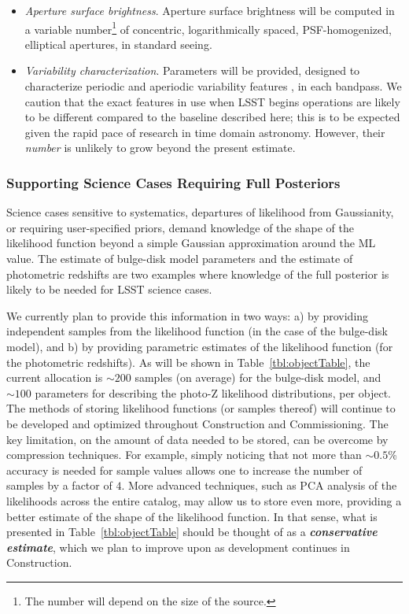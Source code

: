 \documentclass[12pt]{article}
\newcommand{\req}[1]{\marginpar{\tiny #1}}
\newcommand{\dmreq}[1]{\req{DMS-REQ-#1}}
\begin{document}
\begin{itemize}
    \item {\em Aperture surface brightness}. Aperture surface brightness will be computed in a variable number\footnote{The number will depend on the size of the source.} of concentric, logarithmically spaced, PSF-homogenized, elliptical apertures, in standard seeing. \dmreq{0276}

    \item {\em Variability characterization}. Parameters will be provided, designed to characterize periodic and aperiodic variability features \citep{2011ApJ...733...10R}, in each bandpass.
    We caution that the exact features in use when LSST begins operations are likely to be different compared to the baseline described here; this is to be expected given the rapid pace of research in time domain astronomy. However, their {\em number} is unlikely to grow beyond the present estimate. \dmreq{0276}
\end{itemize}

\subsubsection{Supporting Science Cases Requiring Full Posteriors}

Science cases sensitive to systematics, departures of likelihood from Gaussianity, or requiring user-specified priors, demand knowledge of the shape of the likelihood function beyond a simple Gaussian approximation around the ML value. The estimate of bulge-disk model parameters and the estimate of photometric redshifts are two examples where knowledge of the full posterior is likely to be needed for LSST science cases.\dmreq{0046}\dmreq{0276}

We currently plan to provide this information in two ways: a) by providing independent samples from the likelihood function (in the case of the bulge-disk model), and b) by providing parametric estimates of the likelihood function (for the photometric redshifts). As will be shown in Table~\ref{tbl:objectTable}, the current allocation is $\sim 200$ samples (on average) for the bulge-disk model, and $\sim 100$ parameters for describing the photo-Z likelihood distributions, per object.
\\

The methods of storing likelihood functions (or samples thereof) will continue to be developed and optimized throughout Construction and Commissioning. The key limitation, on the amount of data needed to be stored, can be overcome by compression techniques. For example, simply noticing that not more than $\sim 0.5$\% accuracy is needed for sample values allows one to increase the number of samples by a factor of $4$. More advanced techniques, such as PCA analysis of the likelihoods across the entire catalog, may allow us to store even more, providing a better estimate of the shape of the likelihood function. In that sense, what is presented in Table~\ref{tbl:objectTable} should be thought of as a {\bf \em conservative estimate}, which we plan to improve upon as development continues in Construction.
\end{document}
